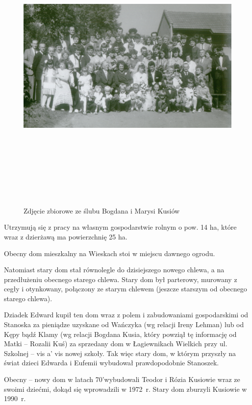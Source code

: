 \begin{figure}
\begin{center}
\includegraphics[height=149mm]{photo/bogdan_marysia_kus_slub_2.jpg}
\caption{Zdjęcie zbiorowe ze ślubu Bogdana i Marysi Kusiów}
\label{rys:bogdan_marysia_kus_slub_2}
\end{center}
\end{figure}

Utrzymują się z pracy na własnym gospodarstwie rolnym o pow. 14 ha, które wraz z dzierżawą ma powierzchnię 25 ha.

Obecny dom mieszkalny na Wieskach stoi w miejscu dawnego ogrodu.

Natomiast stary dom stał równolegle do dzisiejszego nowego chlewa, a na przedłużeniu obecnego starego chlewa. Stary dom był parterowy, murowany z cegły i otynkowany, połączony ze starym chlewem (jeszcze starszym od obecnego starego chlewa).

Dziadek Edward kupił ten dom wraz z polem i zabudowaniami gospodarskimi od Stanoska za pieniądze uzyskane od Wańczyka (wg relacji Ireny Lehman) lub od Kępy bądź Klamy (wg relacji Bogdana Kusia, który powziął tę informację od  Matki – Rozalii Kuś) za sprzedany dom w Łagiewnikach Wielkich przy ul. Szkolnej – vis a’ vis nowej szkoły. Tak więc stary dom, w którym przyszły na świat dzieci Edwarda i Eufemii wybudował prawdopodobnie Stanoszek.

Obecny -- nowy dom w latach 70’wybudowali Teodor i Rózia Kusiowie wraz ze swoimi dziećmi, dokąd się wprowadzili w 1972~r. Stary dom zburzyli Kusiowie w 1990~r.